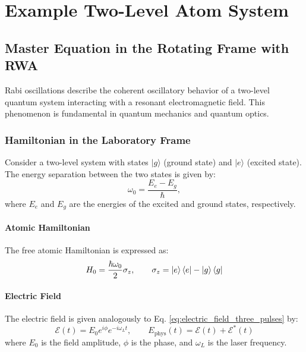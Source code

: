 
\chapter{Example Two-Level Atom System} %

\label{chapter_rabi_oscillations} %


\section{Master Equation in the Rotating Frame with RWA}

Rabi oscillations describe the coherent oscillatory behavior of a two-level quantum system interacting with a resonant electromagnetic field.
This phenomenon is fundamental in quantum mechanics and quantum optics.


\subsection{Hamiltonian in the Laboratory Frame}
Consider a two-level system with states \(|g\rangle\) (ground state) and \(|e\rangle\) (excited state).
The energy separation between the two states is given by:
\begin{equation}
	\omega_0 = \frac{E_e - E_g}{\hbar},
	\label{eq:EnergySeparation}
\end{equation}
where \(E_e\) and \(E_g\) are the energies of the excited and ground states, respectively.

\subsubsection{Atomic Hamiltonian}
The free atomic Hamiltonian is expressed as:
\begin{equation}
	H_0 = \frac{\hbar\omega_0}{2} \sigma_z, \qquad \sigma_z = \ket{e}\bra{e} - \ket{g}\bra{g}
	\label{eq:AtomicHamiltonian}
\end{equation}

\subsubsection{Electric Field}
The electric field is given analogously to Eq. \eqref{eq:electric_field_three_pulses} by:
\begin{equation}
	\mathcal{E}(t) = E_0 e^{i\phi} e^{-i\omega_L t}, \qquad
	E_{\text{phys}}(t) = \mathcal{E}(t) + \mathcal{E}^*(t)
	\label{eq:ElectricFieldComplex}
\end{equation}
where \(E_0\) is the field amplitude, \(\phi\) is the phase, and \(\omega_L\) is the laser frequency.

